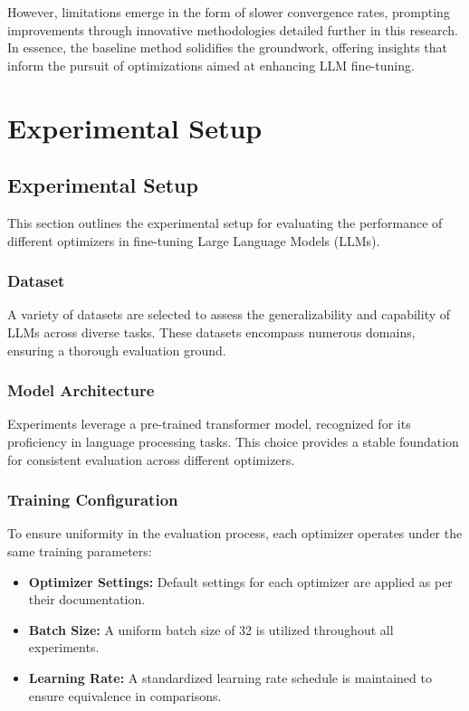 \documentclass{article} %
\begin{document}
However, limitations emerge in the form of slower convergence rates, prompting improvements through innovative methodologies detailed further in this research.\\
In essence, the baseline method solidifies the groundwork, offering insights that inform the pursuit of optimizations aimed at enhancing LLM fine-tuning.

\section{Experimental Setup}
\label{sec:experimental}
\subsection{Experimental Setup}

This section outlines the experimental setup for evaluating the performance of different optimizers in fine-tuning Large Language Models (LLMs).

\subsubsection{Dataset}

A variety of datasets are selected to assess the generalizability and capability of LLMs across diverse tasks. These datasets encompass numerous domains, ensuring a thorough evaluation ground.

\subsubsection{Model Architecture}

Experiments leverage a pre-trained transformer model, recognized for its proficiency in language processing tasks. This choice provides a stable foundation for consistent evaluation across different optimizers.

\subsubsection{Training Configuration}

To ensure uniformity in the evaluation process, each optimizer operates under the same training parameters:
\begin{itemize}
\item \textbf{Optimizer Settings:} Default settings for each optimizer are applied as per their documentation.
\item \textbf{Batch Size:} A uniform batch size of 32 is utilized throughout all experiments.
\item \textbf{Learning Rate:} A standardized learning rate schedule is maintained to ensure equivalence in comparisons.
\end{itemize}
\end{document}
